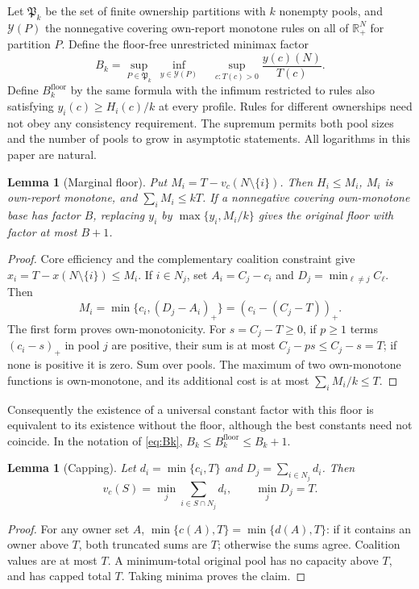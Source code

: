 \documentclass[11pt]{article}
\newtheorem{lemma}[theorem]{Lemma}
\theoremstyle{definition}\newtheorem{definition}[theorem]{Definition}
\theoremstyle{remark}\newtheorem{remark}[theorem]{Remark}
\newcommand{\R}{\mathbb R}
\begin{document}
Let $\mathfrak P_k$ be the set of finite ownership partitions with $k$
nonempty pools, and $\mathcal Y(P)$ the nonnegative covering own-report
monotone rules on all of $\R_+^N$ for partition $P$. Define the floor-free
unrestricted minimax factor
\begin{equation}\label{eq:Bk}
 B_k=\sup_{P\in\mathfrak P_k}\ \inf_{y\in\mathcal Y(P)}\quad
       \sup_{c:T(c)>0}\frac{y(c)(N)}{T(c)}.
\end{equation}
Define $B_k^{\mathrm{floor}}$ by the same formula with the infimum
restricted to rules also satisfying $y_i(c)\ge H_i(c)/k$ at every profile.
Rules for different ownerships need not obey any consistency requirement.
The supremum permits both pool sizes and the number of pools to grow in
asymptotic statements. All logarithms in this paper are natural.

\begin{lemma}[Marginal floor]\label{lem:floor}
Put $M_i=T-v_c(N\setminus\{i\})$. Then $H_i\le M_i$, $M_i$ is own-report
monotone, and $\sum_iM_i\le kT$. If a nonnegative covering own-monotone base
has factor $B$, replacing $y_i$ by $\max\{y_i,M_i/k\}$ gives the original
floor with factor at most $B+1$.
\end{lemma}
\begin{proof}
Core efficiency and the complementary coalition constraint give
$x_i=T-x(N\setminus\{i\})\le M_i$. If $i\in N_j$, set
$A_i=C_j-c_i$ and $D_j=\min_{\ell\ne j}C_\ell$. Then
\[
 M_i=\min\{c_i,(D_j-A_i)_+\}=(c_i-(C_j-T))_+.
\]
The first form proves own-monotonicity. For $s=C_j-T\ge0$, if $p\ge1$
terms $(c_i-s)_+$ in pool $j$ are positive, their sum is at most
$C_j-ps\le C_j-s=T$; if none is positive it is zero. Sum over pools.
The maximum of two own-monotone functions is own-monotone, and its additional
cost is at most $\sum_iM_i/k\le T$.
\end{proof}
Consequently the existence of a universal constant factor with this floor
is equivalent to its existence without the floor, although the best constants
need not coincide. In the notation of \eqref{eq:Bk},
$B_k\le B_k^{\mathrm{floor}}\le B_k+1$.

\begin{lemma}[Capping]\label{lem:cap}
Let $d_i=\min\{c_i,T\}$ and $D_j=\sum_{i\in N_j}d_i$. Then
\[
 v_c(S)=\min_j\sum_{i\in S\cap N_j}d_i,\qquad \min_jD_j=T.
\]
\end{lemma}
\begin{proof}
For any owner set $A$, $\min\{c(A),T\}=\min\{d(A),T\}$: if it contains
an owner above $T$, both truncated sums are $T$; otherwise the sums agree.
Coalition values are at most $T$. A minimum-total original pool has no
capacity above $T$, and has capped total $T$. Taking minima proves the claim.
\end{proof}
\end{document}
